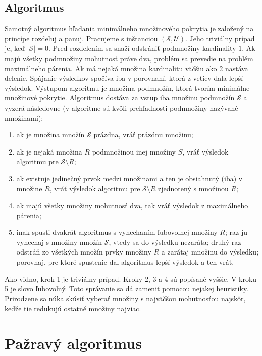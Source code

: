 \subsection{Algoritmus}

Samotný algoritmus hľadania minimálneho množinového pokrytia je založený na 
princípe rozdeľuj a panuj. Pracujeme s inštanciou $(\mathcal{S}, \mathcal{U})$. 
Jeho triviálny prípad je, keď $|\mathcal{S}| = 0$. Pred rozdelením sa snaží 
odstrániť podmnožiny kardinality $1$.  Ak majú všetky podmnožiny mohutnosť 
práve dva, problém sa prevedie na problém maximálneho párenia. Ak má nejaká 
množina kardinalitu väčšiu ako 2 nastáva delenie. Spájanie výsledkov spočíva 
iba v porovnaní, ktorá z vetiev dala lepší výsledok. Výstupom algoritmu je 
množina podmnožín, ktorá tvorím minimálne množinové pokrytie. Algoritmus 
dostáva za vstup iba množinu podmnožín $\mathcal{S}$ a vyzerá následovne 
(v algoritme sú kvôli prehľadnosti podmnožiny nazývané množinami):

\begin{enumerate}
	\item ak je množina množín $\mathcal{S}$ prázdna, vráť prázdnu množinu;
	\item ak je nejaká množina $R$ podmnožinou inej množiny $S$, vráť výsledok 
		algoritmu pre $\mathcal{S} \setminus R$;
	\item ak existuje jedinečný prvok medzi množinami a ten je obsiahnutý (iba) 
		v množine $R$, vráť výsledok algoritmu pre $\mathcal{S} \setminus R$ 
		zjednotený s množinou $R$;
	\item ak majú všetky množiny mohutnosť dva, tak vráť výsledok z maximálneho 
		párenia;
	\item inak spusti dvakrát algoritmus s vynechaním ľubovoľnej množiny $R$; 
		raz ju vynechaj s množiny množín $\mathcal{S}$, vtedy sa do výsledku 
		nezaráta; druhý raz odstráň zo všetkých množín prvky množiny $R$ a 
		zarátaj množinu do výsledku; porovnaj, pre ktoré spustenie dal 
		algoritmus lepší výsledok a ten vráť.
\end{enumerate}

Ako vidno, krok 1 je triviálny prípad. Kroky 2, 3 a 4 sú popísané vyššie. 
V kroku 5 je slovo ľubovoľný. Toto správanie sa dá zameniť pomocou nejakej 
heuristiky. Prirodzene sa núka skúsiť vyberať množiny s najväčšou mohutnosťou 
najskôr, keďže tie redukujú ostatné množiny najviac.

\section{Pažravý algoritmus}\label{sec:greedy}

